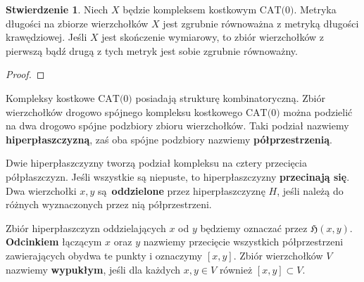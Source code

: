 \documentclass[licencjacka]{pracamgr}
\theoremstyle{definition}
\theoremstyle{definition}
\theoremstyle{definition}
\newtheorem{proposition}{Stwierdzenie}[section]
\theoremstyle{definition}
\theoremstyle{definition}
\theoremstyle{plain}
\theoremstyle{plain}
\begin{document}
\begin{proposition}
	Niech $ X $ będzie kompleksem kostkowym $ \text{CAT(0)}$. Metryka długości na 
	zbiorze wierzchołków $ X $ jest zgrubnie równoważna z metryką długości krawędziowej.
	Jeśli $ X $ jest skończenie wymiarowy, to zbiór wierzchołków z pierwszą bądź drugą z 
	tych metryk jest sobie zgrubnie równoważny.
\end{proposition}
\begin{proof}
%
\end{proof}

Kompleksy kostkowe $ \text{CAT(0)} $ posiadają strukturę kombinatoryczną. Zbiór 
wierzchołków drogowo spójnego kompleksu kostkowego $ \text{CAT(0)} $ można podzielić na dwa 
drogowo spójne podzbiory zbioru wierzchołków. Taki podział nazwiemy 
\textbf{hiperpłaszczyzną}, zaś oba 
spójne podzbiory nazwiemy \textbf{półprzestrzenią}. 

Dwie hiperpłaszczyzny tworzą podział kompleksu na cztery przecięcia półpłaszczyzn. Jeśli 
wszystkie są niepuste, to hiperpłaszczyzny \textbf{przecinają się}. Dwa wierzchołki 
$ x,y $ są \textbf{oddzielone} przez hiperpłaszczyznę $ H $, jeśli należą do różnych 
wyznaczonych przez nią półprzestrzeni. 

Zbiór hiperpłaszczyzn oddzielających $ x $ od $ y $ będziemy oznaczać przez 
$\mathfrak{H}(x,y)$. \textbf{Odcinkiem} łączącym $ x $ oraz $ y $ nazwiemy przecięcie 
wszystkich półprzestrzeni zawierających obydwa te punkty i oznaczymy $ [x,y]$. Zbiór 
wierzchołków $ V $ nazwiemy \textbf{wypukłym}, jeśli dla każdych $ x,y \in V $ również 
$ [x,y] \subset V $.
\end{document}
